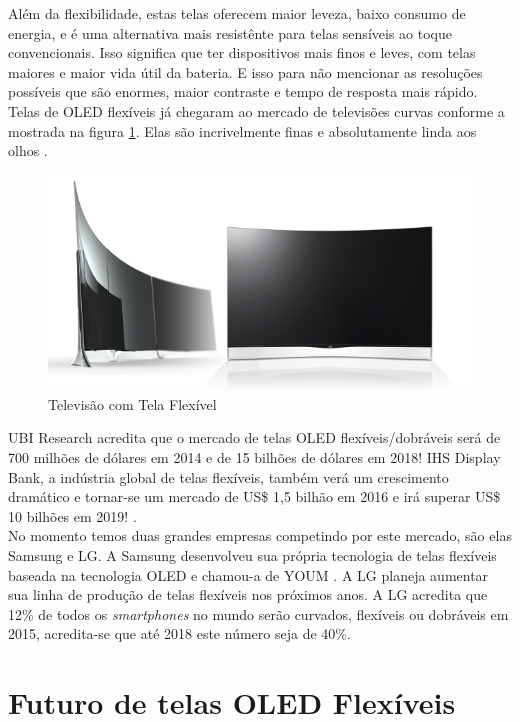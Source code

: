 Além da flexibilidade, estas telas oferecem maior leveza, baixo consumo de energia, e é uma alternativa mais resistênte para telas sensíveis ao toque convencionais. Isso significa que ter dispositivos mais finos e leves, com telas maiores e maior vida útil da bateria. E isso para não mencionar as resoluções possíveis que são enormes, maior contraste e tempo de resposta mais rápido. Telas de OLED flexíveis já chegaram ao mercado de televisões curvas conforme a mostrada na figura \ref{fig:flexible-tv}. Elas são incrivelmente finas e absolutamente linda aos olhos \cite{FSIJS}.\\

\begin{figure}[!ht]
  \centering
  \includegraphics[width=.70\textwidth]{./figuras/flexible-tv} 
  \caption{Televisão com Tela Flexível}
  \label{fig:flexible-tv} 
\end{figure}

UBI Research acredita que o mercado de telas OLED flexíveis/dobráveis será de 700 milhões de dólares em 2014 e de 15 bilhões de dólares em 2018! IHS Display Bank, a indústria global de telas flexíveis, também verá um crescimento dramático e tornar-se um mercado de US\$ 1,5 bilhão em 2016 e irá superar US\$ 10 bilhões em 2019! \cite{NOLEDDN}.\\

No momento temos duas grandes empresas competindo por este mercado, são elas Samsung e LG. A Samsung desenvolveu sua própria tecnologia de telas flexíveis baseada na tecnologia OLED e chamou-a de YOUM \cite{SYOUM}. A LG planeja aumentar sua linha de produção de telas flexíveis nos próximos anos. A LG acredita que 12\% de todos os \textit{smartphones} no mundo serão curvados, flexíveis ou dobráveis em 2015, acredita-se que até 2018 este número seja de 40\%.\\


\section{Futuro de telas OLED Flexíveis}
\label{sec:futuro}

